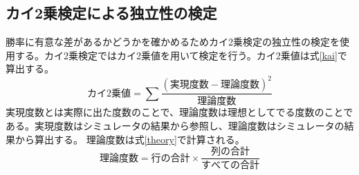 \subsection{カイ2乗検定による独立性の検定}
勝率に有意な差があるかどうかを確かめるためカイ2乗検定の独立性の検定を使用する。カイ2乗検定ではカイ2乗値を用いて検定を行う。カイ2乗値は式\ref{kai}で算出する。
\begin{equation} カイ2乗値 = \sum{ \frac{(実現度数 - 理論度数)^2}{理論度数}} \label{kai}\end{equation}
実現度数とは実際に出た度数のことで、理論度数は理想としてでる度数のことである。実現度数はシミュレータの結果から参照し、理論度数はシミュレータの結果から算出する。
理論度数は式\ref{theory}で計算される。
\begin{equation} 理論度数 =  行の合計 ×\frac{列の合計}{すべての合計} \label{theory}\end{equation}

